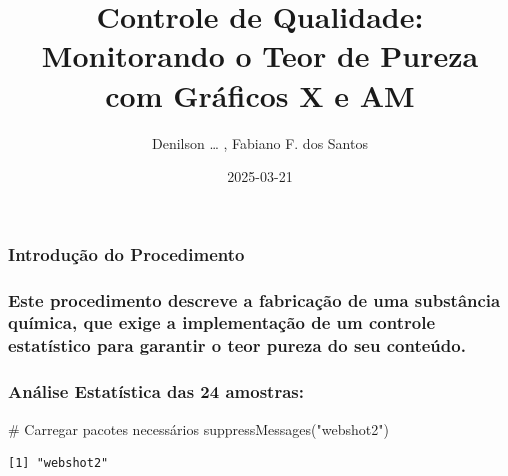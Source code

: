 \documentclass[
  letterpaper,
  DIV=11,
  numbers=noendperiod]{scrartcl}
\title{Controle de Qualidade: Monitorando o Teor de Pureza com Gráficos
X e AM}
\author{Denilson \ldots{} , Fabiano F. dos Santos}
\date{2025-03-21}
\newenvironment{Shaded}{\begin{snugshade}}{\end{snugshade}}
\newcommand{\CommentTok}[1]{\textcolor[rgb]{0.37,0.37,0.37}{#1}}
\newcommand{\FunctionTok}[1]{\textcolor[rgb]{0.28,0.35,0.67}{#1}}
\newcommand{\NormalTok}[1]{\textcolor[rgb]{0.00,0.23,0.31}{#1}}
\newcommand{\StringTok}[1]{\textcolor[rgb]{0.13,0.47,0.30}{#1}}
\begin{document}
\maketitle


\subsubsection{Introdução do
Procedimento}\label{introduuxe7uxe3o-do-procedimento}

\subsubsection{Este procedimento descreve a fabricação de uma substância
química, que exige a implementação de um controle estatístico para
garantir o teor pureza do seu
conteúdo.}\label{este-procedimento-descreve-a-fabricauxe7uxe3o-de-uma-substuxe2ncia-quuxedmica-que-exige-a-implementauxe7uxe3o-de-um-controle-estatuxedstico-para-garantir-o-teor-pureza-do-seu-conteuxfado.}

\subsubsection{Análise Estatística das 24
amostras:}\label{anuxe1lise-estatuxedstica-das-24-amostras}

\begin{Shaded}
\begin{Highlighting}[]
\CommentTok{\# Carregar pacotes necessários}
\FunctionTok{suppressMessages}\NormalTok{(}\StringTok{"webshot2"}\NormalTok{)}
\end{Highlighting}
\end{Shaded}

\begin{verbatim}
[1] "webshot2"
\end{verbatim}
\end{document}
